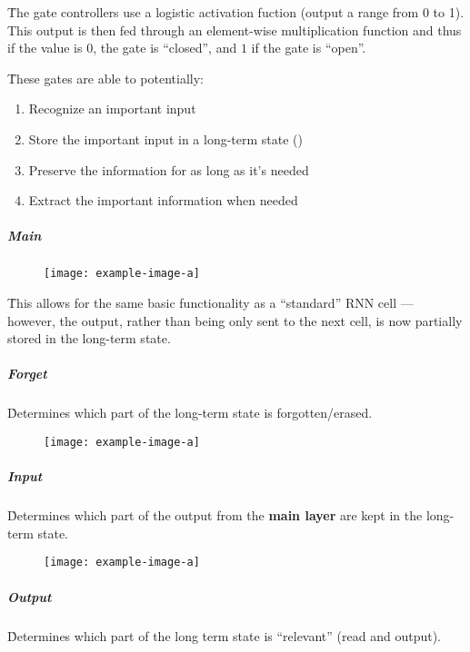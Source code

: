 \r{The gate controllers use a logistic activation fuction (output a range from 0 to 1). This output is then fed through an element-wise multiplication function and thus if the value is $0$, the gate is ``closed'', and $1$ if the gate is ``open''.}

\r{These gates are able to potentially:}

\begin{enumerate}[noitemsep,topsep=0pt]
	\item Recognize an important input
	\item Store the important input in a long-term state ()
	\item Preserve the information for as long as it's needed
	\item Extract the important information when needed
\end{enumerate}


\subparagraph{Main}

\begin{figure}
	\centering
	\texttt{[image: example-image-a]}\hfil
	\caption{}
\end{figure}

\r{This allows for the same basic functionality as a ``standard'' RNN cell --- however, the output, rather than being only sent to the next cell, is now partially stored in the long-term state.}


\subparagraph{Forget}

\r{Determines which part of the long-term state is forgotten/erased.}

\begin{figure}
	\centering
	\texttt{[image: example-image-a]}\hfil
	\caption{}
\end{figure}



\subparagraph{Input}

\r{Determines which part of the output from the \textbf{main layer} are kept in the long-term state.}

\begin{figure}
	\centering
	\texttt{[image: example-image-a]}\hfil
	\caption{}
\end{figure}

\subparagraph{Output}

\r{Determines which part of the long term state is ``relevant'' (read and output).}

